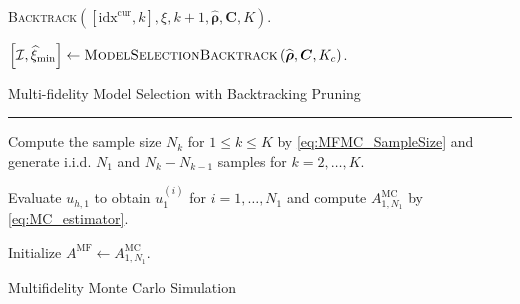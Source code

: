 \begin{algorithm}[!ht]
{{    
    
    \textsc{Backtrack}$\left([\text{idx}^{\text{cur}}, k], \xi, k+1,\widehat{\boldsymbol{\rho}}, \boldsymbol{C},K \right)$. \;
  }
}

\vspace{3mm} 
$\left[\mathcal{I},  \widehat{\xi}_{\min} \right] \gets \textsc{ModelSelectionBacktrack}\left(\widehat{\boldsymbol{\rho}}, \boldsymbol{C},K_c \right)$. \;

\caption{Multi-fidelity Model Selection with Backtracking Pruning}
\end{algorithm}
\ULforem





\normalem
\begin{algorithm}[!ht]
\label{algo:MFMC_Algo}
\DontPrintSemicolon

    
   \vspace{1ex}
    
    \vspace{1ex}
    \hrule \vspace{1ex}
    

    Compute the sample size $N_k$ for $1\leq k\leq K$ by \eqref{eq:MFMC_SampleSize} and generate i.i.d. $N_1$ and $N_k-N_{k-1}$ samples for $k=2,\ldots, K$.

    Evaluate $u_{h, 1}$ to obtain $u_1^{(i)}$ for $i = 1,\ldots,N_1$ and compute $A_{1,N_1}^{\text{MC}}$ by \eqref{eq:MC_estimator}.

    Initialize $A^{\text{MF}} \gets A_{1,N_1}^{\text{MC}}$.
    

    
\caption{Multifidelity Monte Carlo Simulation}
\end{algorithm}
\ULforem

